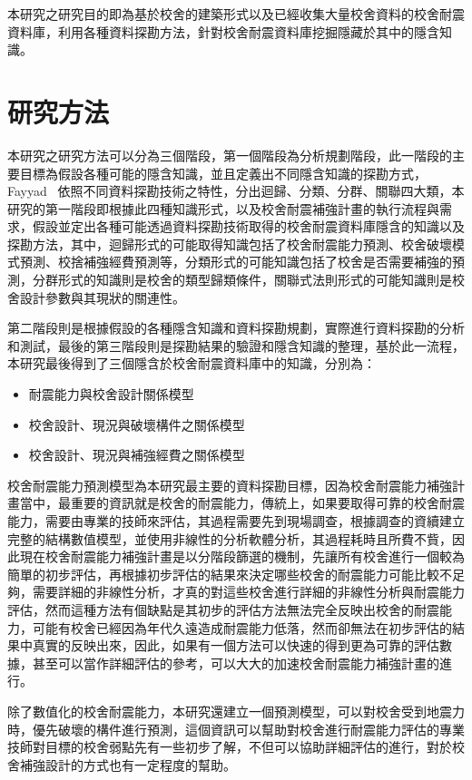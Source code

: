 本研究之研究目的即為基於校舍的建築形式以及已經收集大量校舍資料的校舍耐震資料庫，利用各種資料探勘方法，針對校舍耐震資料庫挖掘隱藏於其中的隱含知識。

\section{研究方法}

本研究之研究方法可以分為三個階段，第一個階段為分析規劃階段，此一階段的主要目標為假設各種可能的隱含知識，並且定義出不同隱含知識的探勘方式，Fayyad~\cite{fayyad1996data} 依照不同資料探勘技術之特性，分出迴歸、分類、分群、關聯四大類，本研究的第一階段即根據此四種知識形式，以及校舍耐震補強計畫的執行流程與需求，假設並定出各種可能透過資料探勘技術取得的校舍耐震資料庫隱含的知識以及探勘方法，其中，迴歸形式的可能取得知識包括了校舍耐震能力預測、校舍破壞模式預測、校捨補強經費預測等，分類形式的可能知識包括了校舍是否需要補強的預測，分群形式的知識則是校舍的類型歸類條件，關聯式法則形式的可能知識則是校舍設計參數與其現狀的關連性。

第二階段則是根據假設的各種隱含知識和資料探勘規劃，實際進行資料探勘的分析和測試，最後的第三階段則是探勘結果的驗證和隱含知識的整理，基於此一流程，本研究最後得到了三個隱含於校舍耐震資料庫中的知識，分別為：

\begin{itemize}
\item 耐震能力與校舍設計關係模型
\item 校舍設計、現況與破壞構件之關係模型
\item 校舍設計、現況與補強經費之關係模型
\end{itemize}

校舍耐震能力預測模型為本研究最主要的資料探勘目標，因為校舍耐震能力補強計畫當中，最重要的資訊就是校舍的耐震能力，傳統上，如果要取得可靠的校舍耐震能力，需要由專業的技師來評估，其過程需要先到現場調查，根據調查的資續建立完整的結構數值模型，並使用非線性的分析軟體分析，其過程耗時且所費不貲，因此現在校舍耐震能力補強計畫是以分階段篩選的機制，先讓所有校舍進行一個較為簡單的初步評估，再根據初步評估的結果來決定哪些校舍的耐震能力可能比較不足夠，需要詳細的非線性分析，才真的對這些校舍進行詳細的非線性分析與耐震能力評估，然而這種方法有個缺點是其初步的評估方法無法完全反映出校舍的耐震能力，可能有校舍已經因為年代久遠造成耐震能力低落，然而卻無法在初步評估的結果中真實的反映出來，因此，如果有一個方法可以快速的得到更為可靠的評估數據，甚至可以當作詳細評估的參考，可以大大的加速校舍耐震能力補強計畫的進行。

除了數值化的校舍耐震能力，本研究還建立一個預測模型，可以對校舍受到地震力時，優先破壞的構件進行預測，這個資訊可以幫助對校舍進行耐震能力評估的專業技師對目標的校舍弱點先有一些初步了解，不但可以協助詳細評估的進行，對於校舍補強設計的方式也有一定程度的幫助。

